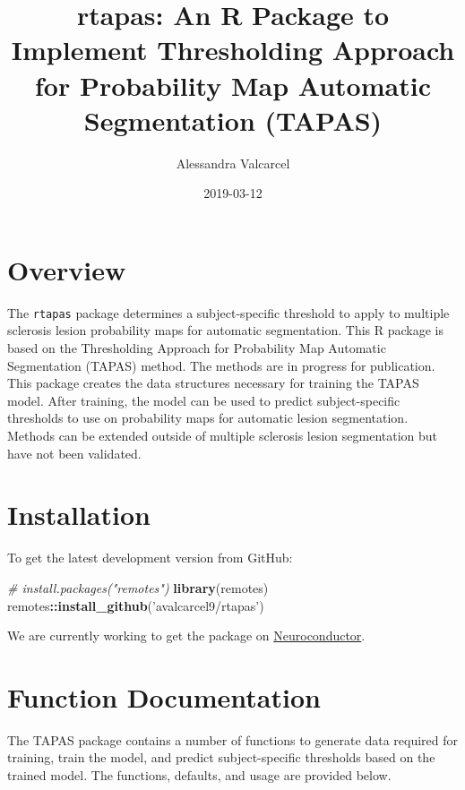 \documentclass[]{article}
\title{rtapas: An R Package to Implement Thresholding Approach for Probability
Map Automatic Segmentation (TAPAS)}
\author{Alessandra Valcarcel}
\date{2019-03-12}
\newenvironment{Shaded}{\begin{snugshade}}{\end{snugshade}}
\newcommand{\CommentTok}[1]{\textcolor[rgb]{0.56,0.35,0.01}{\textit{#1}}}
\newcommand{\KeywordTok}[1]{\textcolor[rgb]{0.13,0.29,0.53}{\textbf{#1}}}
\newcommand{\NormalTok}[1]{#1}
\newcommand{\OperatorTok}[1]{\textcolor[rgb]{0.81,0.36,0.00}{\textbf{#1}}}
\newcommand{\StringTok}[1]{\textcolor[rgb]{0.31,0.60,0.02}{#1}}
\begin{document}
\maketitle

\hypertarget{overview}{%
\section{Overview }\label{overview}}

The \texttt{rtapas} package determines a subject-specific threshold to
apply to multiple sclerosis lesion probability maps for automatic
segmentation. This R package is based on the Thresholding Approach for
Probability Map Automatic Segmentation (TAPAS) method. The methods are
in progress for publication. This package creates the data structures
necessary for training the TAPAS model. After training, the model can be
used to predict subject-specific thresholds to use on probability maps
for automatic lesion segmentation. Methods can be extended outside of
multiple sclerosis lesion segmentation but have not been validated.

\hypertarget{installation}{%
\section{Installation}\label{installation}}

To get the latest development version from GitHub:

\begin{Shaded}
\begin{Highlighting}[]
\CommentTok{# install.packages("remotes")}
\KeywordTok{library}\NormalTok{(remotes)}
\NormalTok{remotes}\OperatorTok{::}\KeywordTok{install_github}\NormalTok{(}\StringTok{'avalcarcel9/rtapas'}\NormalTok{)}
\end{Highlighting}
\end{Shaded}

We are currently working to get the package on
\href{www.neuroconductor.org}{Neuroconductor}.

\hypertarget{function-documentation}{%
\section{Function Documentation}\label{function-documentation}}

The TAPAS package contains a number of functions to generate data
required for training, train the model, and predict subject-specific
thresholds based on the trained model. The functions, defaults, and
usage are provided below.
\end{document}
